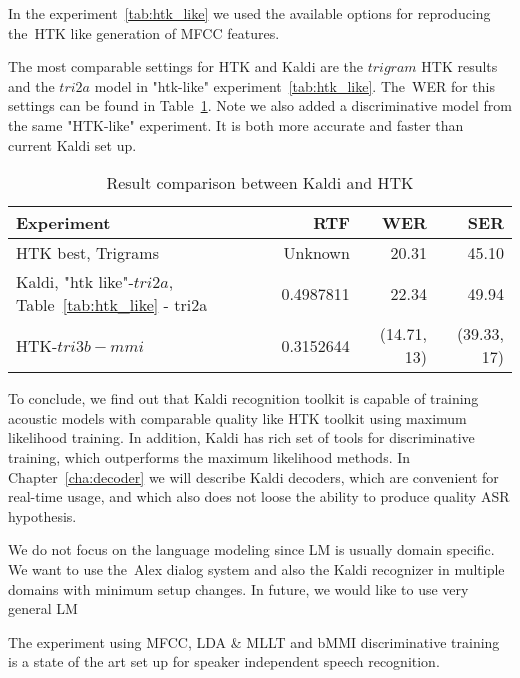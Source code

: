 In the experiment~\ref{tab:htk_like} we used the available options for reproducing the~\ac{HTK} like generation
of \ac{MFCC} features.

The most comparable settings for \ac{HTK} and Kaldi are the $trigram$ \ac{HTK} results
and the $tri2a$ model in "htk-like" experiment~\ref{tab:htk_like}. 
The~\ac{WER} for this settings can be found in Table~\ref{tab:compare}.
Note we also added a discriminative model from the same "\ac{HTK}-like" experiment.
It is both more accurate and faster than current Kaldi set up.

\begin{table}[!htp]\label{tab:compare}\centering\begin{tabular}{l|rrr}
    Experiment   & \ac{RTF} & \ac{WER} & \ac{SER} \\
\hline
\hline
\ac{HTK} best, Trigrams   & Unknown  & 20.31  & 45.10  \\
Kaldi, "htk like"-$tri2a$, Table~\ref{tab:htk_like} - tri2a & 0.4987811 & 22.34 & 49.94\\
\hline
\ac{HTK}-$tri3b-mmi$       & 0.3152644     & (14.71, 13) & (39.33, 17)\\ 
\end{tabular} \caption{Result comparison between Kaldi and \ac{HTK}} \end{table}  

To conclude, we find out that Kaldi recognition toolkit is capable of training acoustic models with comparable quality 
like \ac{HTK} toolkit using maximum likelihood training. In addition, Kaldi has rich set of tools for discriminative training, 
which outperforms the maximum likelihood methods.
In Chapter~\ref{cha:decoder} we will describe Kaldi decoders, which are convenient for real-time usage, 
and which also does not loose the ability to produce quality ASR hypothesis.

We do not focus on the language modeling since \ac{LM} is usually domain specific.
We want to use the~Alex dialog system and also the Kaldi recognizer in multiple domains with minimum
setup changes. 
In future, we would like to use very general \ac{LM} 

The experiment using \ac{MFCC}, \ac{LDA} \& \ac{MLLT} and \ac{bMMI} discriminative training is
a state of the art set up for speaker independent speech recognition\cite{morbini2013asr}.
